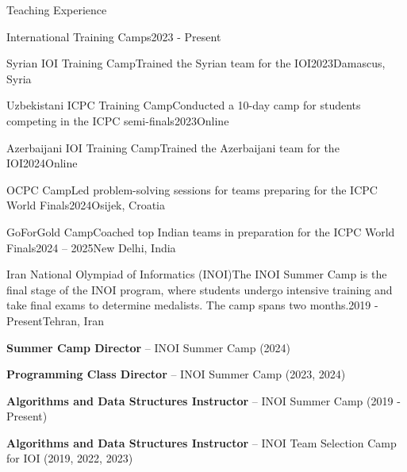 
\begin{section}{Teaching Experience}

    \begin{subsectionnobullet}{International Training Camps}{}{2023 - Present}{}
    \end{subsectionnobullet}

    \begin{subsectionnobullet}{Syrian IOI Training Camp}{Trained the Syrian team for the IOI}{2023}{Damascus, Syria}
    \end{subsectionnobullet}

    \begin{subsectionnobullet}{Uzbekistani ICPC Training Camp}{Conducted a 10-day camp for students competing in the ICPC semi-finals}{2023}{Online}
    \end{subsectionnobullet}

    \begin{subsectionnobullet}{Azerbaijani IOI Training Camp}{Trained the Azerbaijani team for the IOI}{2024}{Online}
    \end{subsectionnobullet}

    \begin{subsectionnobullet}{OCPC Camp}{Led problem-solving sessions for teams preparing for the ICPC World Finals}{2024}{Osijek, Croatia}
    \end{subsectionnobullet}

    \begin{subsectionnobullet}{GoForGold Camp}{Coached top Indian teams in preparation for the ICPC World Finals}{2024 -- 2025}{New Delhi, India}
    \end{subsectionnobullet}

  \vspace{0.5cm}

  \begin{subsection}{Iran National Olympiad of Informatics (INOI)}{The INOI Summer Camp is the final stage of the INOI program, where students undergo intensive training and take final exams to determine medalists. The camp spans two months.}{2019 - Present}{Tehran, Iran}
    \item \textbf{Summer Camp Director} – INOI Summer Camp (2024)
    \item \textbf{Programming Class Director} – INOI Summer Camp (2023, 2024)
    \item \textbf{Algorithms and Data Structures Instructor} – INOI Summer Camp (2019 - Present)
    \item \textbf{Algorithms and Data Structures Instructor} – INOI Team Selection Camp for IOI (2019, 2022, 2023)
  \end{subsection}


\end{section}
